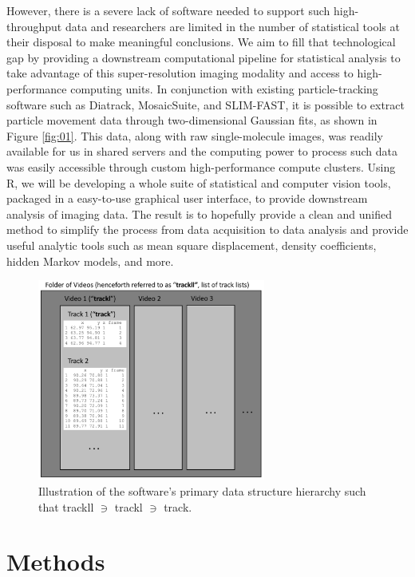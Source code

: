 \documentclass{bioinfo}
\begin{document}
However, there is a severe lack of software needed to support such high-throughput data and researchers are limited in the number of statistical tools at their disposal to make meaningful conclusions. We aim to fill that technological gap by providing a downstream computational pipeline for statistical analysis to take advantage of this super-resolution imaging modality and access to high-performance computing units. In conjunction with existing particle-tracking software such as Diatrack, MosaicSuite, and SLIM-FAST, it is possible to extract particle movement data through two-dimensional Gaussian fits, as shown in Figure \ref{fig:01}. This data, along with raw single-molecule images, was readily available for us in shared servers and the computing power to process such data was easily accessible through custom high-performance compute clusters. Using R, we will be developing a whole suite of statistical and computer vision tools, packaged in a easy-to-use graphical user interface, to provide downstream analysis of imaging data. The result is to hopefully provide a clean and unified method to simplify the process from data acquisition to data analysis and provide useful analytic tools such as mean square displacement, density coefficients, hidden Markov models, and more.

\begin{figure}[b]
\centerline{\includegraphics[width=75mm]{ds.png}}
\caption{Illustration of the software's primary data structure hierarchy such that trackll $\ni$ trackl $\ni$ track.}\label{fig:03}
\end{figure}

\section{Methods}
\end{document}
